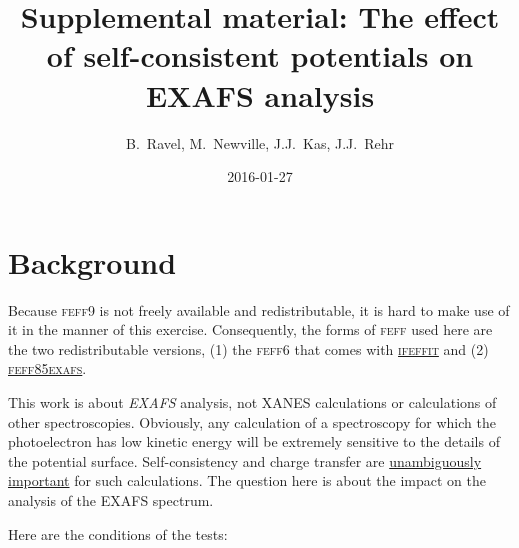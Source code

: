 \documentclass[11pt]{article}
\author{B.\ Ravel, M.\ Newville, J.J.\ Kas, J.J.\ Rehr}
\date{2016-01-27}
\title{Supplemental material: The effect of self-consistent potentials on EXAFS analysis}
\begin{document}
\maketitle
\tableofcontents


\section{Background}
\label{sec:orgheadline1}


Because \textsc{feff9} is not freely available and redistributable, it
is hard to make use of it in the manner of this
exercise. Consequently, the forms of \textsc{feff} used here are the two
redistributable versions, (1) the \textsc{feff6} that comes with
\href{https://github.com/newville/ifeffit}{\textsc{ifeffit}} and (2)
\href{https://github.com/xraypy/feff85exafs}{\textsc{feff85exafs}}.

This work is about \emph{EXAFS} analysis, not XANES calculations or
calculations of other spectroscopies. Obviously, any calculation of a
spectroscopy for which the photoelectron has low kinetic energy will
be extremely sensitive to the details of the potential surface.
Self-consistency and charge transfer are
\href{http://dx.doi.org/10.1103/PhysRevB.58.7565}{unambiguously
  important} for such calculations. The question here is about the
impact on the analysis of the EXAFS spectrum.


Here are the conditions of the tests:
\end{document}
